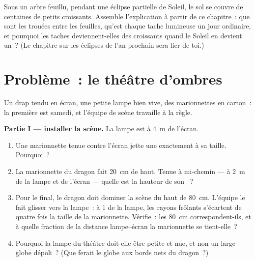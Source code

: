 \begin{exercise}[$\star\star\star$]\label{exo:g6:light-propagation:12}
Sous un arbre feuillu, pendant une éclipse partielle de Soleil, le
sol se couvre de centaines de petits croissants. Assemble
l'explication à partir de ce chapitre~: que sont les trouées entre
les feuilles, qu'est chaque tache lumineuse un jour ordinaire, et
pourquoi les taches deviennent-elles des croissants quand le Soleil
en devient un~? (Le chapitre sur les éclipses de l'an prochain sera
fier de toi.)
\end{exercise}

\section{Problème~: le théâtre d'ombres}

\begin{problem}\label{pb:g6:light-propagation:1}
Un drap tendu en écran, une petite lampe bien vive, des marionnettes
en carton~: la première est samedi, et l'équipe de scène travaille à
la règle.

\medskip\noindent\textbf{Partie I --- installer la scène.}
La lampe est à \qty{4}{m} de l'écran.
\begin{enumerate}
  \item Une marionnette tenue contre l'écran jette une 
        exactement à sa taille. Pourquoi~?
  \item La marionnette du dragon fait \qty{20}{cm} de haut. Tenue à
        mi-chemin --- à \qty{2}{m} de la lampe et de l'écran ---
        quelle est la hauteur de son ~?
  \item Pour le final, le dragon doit dominer la scène du haut de
        \qty{80}{cm}. L'équipe le fait glisser vers la lampe~: à
        $1$  de la lampe, les rayons frôlants s'écartent de
        quatre fois la taille de la marionnette. Vérifie~: les
        \qty{80}{cm} correspondent-ils, et à quelle fraction de la
        distance lampe--écran la marionnette se tient-elle~?
  \item Pourquoi la lampe du théâtre doit-elle être petite et nue,
        et non un large globe dépoli~? (Que ferait le globe aux
        bords nets du dragon~?)
\end{enumerate}


\end{problem}
